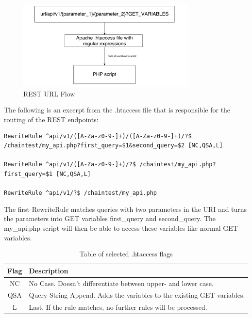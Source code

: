 \begin{figure}
  \centering
    \includegraphics[width=0.8\textwidth]{figs/htaccess_file.pdf}
   \caption{REST URL Flow} 
   \label{fig:htaccess_file}
\end{figure}

The following is an excerpt from the .htaccess file that is responsible for the routing of the REST endpoints:
\begin{tiny}
\begin{verbatim}
RewriteRule ^api/v1/([A-Za-z0-9-]+)/([A-Za-z0-9-]+)/?$ 
/chaintest/my_api.php?first_query=$1&second_query=$2 [NC,QSA,L]

RewriteRule ^api/v1/([A-Za-z0-9-]+)/?$ /chaintest/my_api.php?first_query=$1 [NC,QSA,L]

RewriteRule ^api/v1/?$ /chaintest/my_api.php
\end{verbatim}
\end{tiny}

The first RewriteRule matches queries with two parameters in the URI and turns the parameters into GET variables first\_query and second\_query. The my\_api.php script will then be able to access these variables like normal GET variables. 

\begin{table}
	\begin{center}
		\begin{tabular}	{ | c | p{7cm} |}
		\hline
		Flag & Description \\ \hline
		NC & No Case. Doesn't differentiate between upper- and lower case. \\ \hline
		QSA & Query String Append. Adds the variables to the existing GET variables. \\ \hline
		L & Last. If the rule matches, no further rules will be processed. \\ \hline
		
		
		\end{tabular}
		\caption{Table of selected .htaccess flags} 
		\label{tbl:htaccess_flags}
	\end{center}
\end{table}
